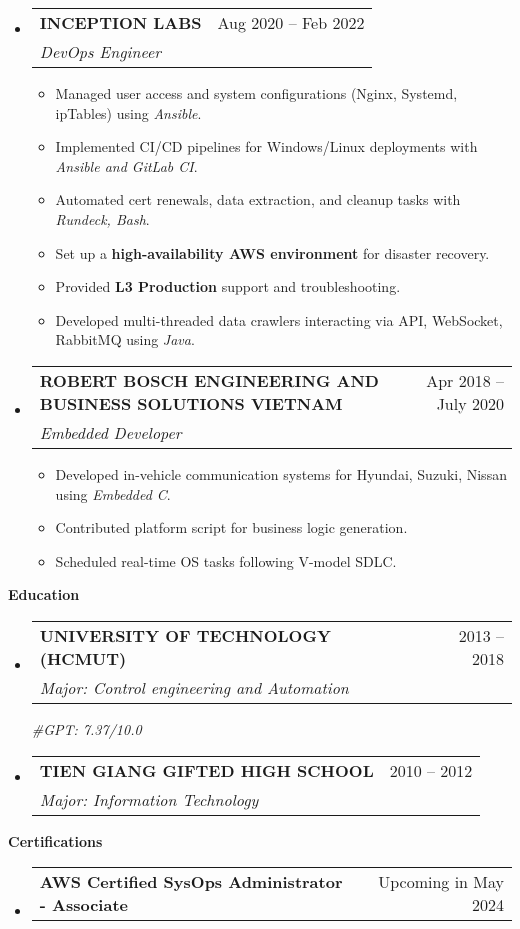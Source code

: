 \documentclass[letterpaper,12pt]{article}[leftmargin=*]
\makeatletter
\def \entryspacing {5pt}
\renewcommand{\section}[2]{\vspace{5pt}
  \colorbox{secondary}{\color{white}\raggedbottom\normalsize\textbf{{#1}{\hspace{7pt}#2}}}
}
\newcommand{\resumeEntryStart}{\begin{itemize}[leftmargin=2.5mm]}
\newcommand{\resumeEntryEnd}{\end{itemize}\vspace{\entryspacing}}
\newcommand{\resumeItemListStart}{\begin{itemize}[leftmargin=4.5mm]}
\newcommand{\resumeItemListEnd}{\end{itemize}}
\newcommand{\resumeItem}[1]{
  \item\small{
    {#1 \vspace{-2pt}}
  }
}
\newcommand{\resumeEntryTSDL}[4]{
  \vspace{-1pt}\item[]
    \begin{tabularx}{0.97\textwidth}{X@{\hspace{60pt}}r}
      \textbf{\color{primary}#1} & {\firabook\color{accent}\small#2} \\
      \textit{\color{accent}\small#3} & {\firabook\color{accent}\small#4} \\
    \end{tabularx}\vspace{-6pt}
}
\newcommand{\resumeEntryTD}[2]{
  \vspace{1pt}\item[]
    \begin{tabularx}{0.97\textwidth}{X@{\hspace{60pt}}r}
      \textbf{\color{primary}#1} & {\firabook\color{accent}\small#2} \\
    \end{tabularx}\vspace{-6pt}
}
\makeatother
\begin{document}
  \resumeEntryStart
    \resumeEntryTSDL
      {INCEPTION LABS}{Aug 2020 -- Feb 2022}
      {DevOps Engineer}{}
    \resumeItemListStart
      \resumeItem {Managed user access and system configurations (Nginx, Systemd, ipTables) using \textit{Ansible}.}
      \resumeItem {Implemented CI/CD pipelines for Windows/Linux deployments with \textit{Ansible and GitLab CI}.}
      \resumeItem {Automated cert renewals, data extraction, and cleanup tasks with \textit{Rundeck, Bash}.}
      \resumeItem {Set up a \textbf{high-availability AWS environment} for disaster recovery.}
      \resumeItem {Provided \textbf{L3 Production} support and troubleshooting.}
      \resumeItem {Developed multi-threaded data crawlers interacting via API, WebSocket, RabbitMQ using \textit{Java}.}
    \resumeItemListEnd
  \resumeEntryEnd

  \resumeEntryStart
    \resumeEntryTSDL
      {ROBERT BOSCH ENGINEERING AND BUSINESS SOLUTIONS VIETNAM}{Apr 2018 -- July 2020}
      {Embedded Developer}{}
    \resumeItemListStart
      \resumeItem {Developed in-vehicle communication systems for Hyundai, Suzuki, Nissan using \textit{Embedded C}.}
      \resumeItem {Contributed platform script for business logic generation.}
      \resumeItem {Scheduled real-time OS tasks following V-model SDLC.}
    \resumeItemListEnd
  \resumeEntryEnd

  \section{\faGraduationCap}{Education}
    \resumeEntryStart
      \resumeEntryTSDL
        {UNIVERSITY OF TECHNOLOGY (HCMUT)}{2013 -- 2018}
        {Major: Control engineering and Automation}{\vspace{5pt}}
        \textit{\color{accent}\small#GPT: 7.37/10.0}
      \resumeEntryTSDL
        {TIEN GIANG GIFTED HIGH SCHOOL}{2010 -- 2012}
        {Major: Information Technology}{}
  \resumeEntryEnd


\section{\faAward}{Certifications}
  \resumeEntryStart
    \resumeEntryTD
      {AWS Certified SysOps Administrator - Associate}{Upcoming in May 2024}
  \resumeEntryEnd
  \vspace{-20pt}
  
\end{document}
